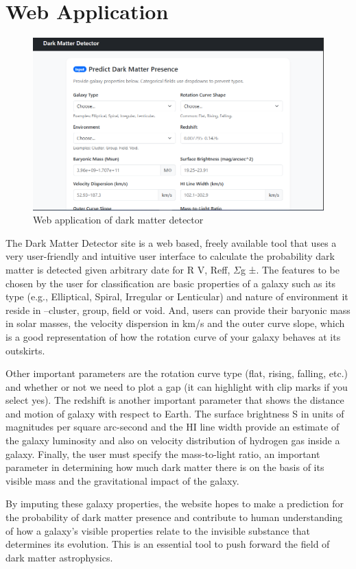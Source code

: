 \section{Web Application}
\begin{figure}
    \centering
    \includegraphics[width=0.5\linewidth]{Chap4/web-application.png}
    \caption{Web application of dark matter detector}
    \label{fig:placeholder}
\end{figure}
The Dark Matter Detector site is a web based, freely available tool that uses a very user-friendly and intuitive user interface to calculate the probability dark matter is detected given arbitrary date for R V, Reff, $\Sigma$g ±. The features to be chosen by the user for classification are basic properties of a galaxy such as its type (e.g., Elliptical, Spiral, Irregular or Lenticular) and nature of environment it reside in –cluster, group, field or void. And, users can provide their baryonic mass in solar masses, the velocity dispersion in km/s and the outer curve slope, which is a good representation of how the rotation curve of your galaxy behaves at its outskirts.

Other important parameters are the rotation curve type (flat, rising, falling, etc.) and whether or not we need to plot a gap (it can highlight with clip marks if you select yes). The redshift is another important parameter that shows the distance and motion of galaxy with respect to Earth. The surface brightness S in units of magnitudes per square arc-second and the HI line width provide an estimate of the galaxy luminosity and also on velocity distribution of hydrogen gas inside a galaxy. Finally, the user must specify the mass-to-light ratio, an important parameter in determining how much dark matter there is on the basis of its visible mass and the gravitational impact of the galaxy.

By imputing these galaxy properties, the website hopes to make a prediction for the probability of dark matter presence and contribute to human understanding of how a galaxy’s visible properties relate to the invisible substance that determines its evolution. This is an essential tool to push forward the field of dark matter astrophysics.

 